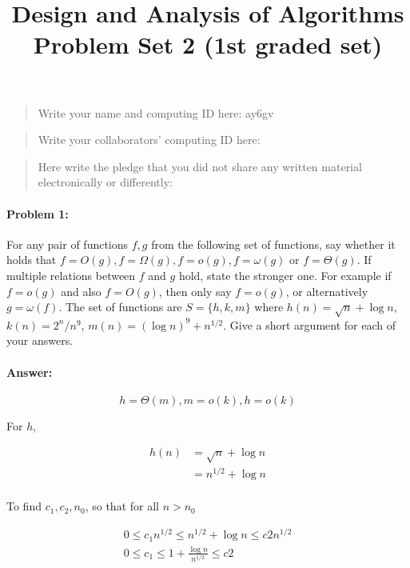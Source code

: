\documentclass{article}
\title{Design and Analysis of Algorithms\\ {\bf Problem Set 2 (1st graded set)}}
\author{}
\begin{document}
\maketitle

\begin{quote}
    Write your name and computing ID here: ay6gv
\end{quote}

\vspace{20px}

\begin{quote}
    Write your collaborators' computing ID here:
\end{quote}

\vspace{20px}

\begin{quote}
    Here write the pledge that you did not share any written material electronically or differently:
\end{quote}

\newpage
\paragraph{Problem 1:} For any pair of functions $f,g$ from the following set of functions, say whether it holds that $f=O(g), f=\Omega(g), f=o(g), f=\omega(g) $ or $f=\Theta(g)$. If multiple relations between $f$ and $g$ hold, state the stronger one. For example if $f=o(g)$ and also $f=O(g)$, then only say $f=o(g)$, or alternatively $g=\omega(f)$.  The set of functions are $S= \{h,k,m\}$ where $h(n)=\sqrt{n}+\log n$, $k(n) = 2^n/n^9$, $m(n) = (\log n)^9 + n^{1/2}$. Give a short argument for each of your answers.


\paragraph{Answer:}

$$h = \Theta(m), m = o(k), h = o(k)$$

For $h$,

$$\begin{aligned}
h(n)&=\sqrt{n}+\log n\\
&=n^{1/2}+\log n\\
\end{aligned}$$

To find $c_1, c_2, n_0$, so that for all $n>n_0$

$$\begin{aligned}
0 \le c_1n^{1/2} \le n^{1/2}+\log n \le c2n^{1/2}\\
0 \le c_1 \le 1+\frac{\log n}{n^{1/2}} \le c2
\end{aligned}$$
\end{document}
